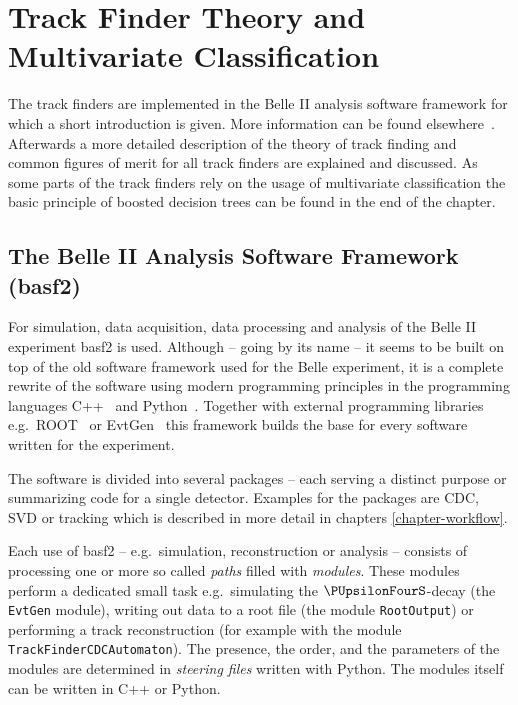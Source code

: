 \chapter{Track Finder Theory and Multivariate Classification} \label{chapter-theory}

The track finders are implemented in the Belle II analysis software framework for which a short introduction is given. More information can be found elsewhere~\cite{moll_basf2}. Afterwards a more detailed description of the theory of track finding and common figures of merit for all track finders are explained and discussed. As some parts of the track finders rely on the usage of multivariate classification the basic principle of boosted decision trees can be found in the end of the chapter.

\section{The Belle II Analysis Software Framework (basf2)}

For simulation, data acquisition, data processing and analysis of the Belle II experiment basf2 is used. Although -- going by its name -- it seems to be built on top of the old software framework used for the Belle experiment, it is a complete rewrite of the software using modern programming principles in the programming languages C++~\cite{cpp} and Python~\cite{python}. Together with external programming libraries e.g.\ ROOT~\cite{root} or EvtGen~\cite{evtgen} this framework builds the base for every software written for the experiment.

The software is divided into several packages -- each serving a distinct purpose or summarizing code for a single detector. Examples for the packages are CDC, SVD or tracking which is described in more detail in chapters \ref{chapter-workflow}.

Each use of basf2 -- e.g.\ simulation, reconstruction or analysis -- consists of processing one or more so called \emph{paths} filled with \emph{modules}. These modules perform a dedicated small task e.g.\ simulating the $\PUpsilonFourS$-decay (the \texttt{EvtGen} module), writing out data to a root file (the module \texttt{RootOutput}) or performing a track reconstruction (for example with the module \texttt{TrackFinderCDCAutomaton}). The presence, the order, and the parameters of the modules are determined in \emph{steering files} written with Python. The modules itself can be written in C++ or Python. 

